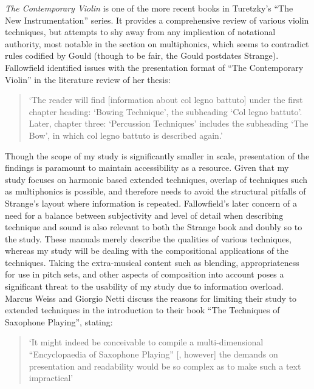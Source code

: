 \textit{The Contemporary Violin} is one of the more recent books in Turetzky’s “The New Instrumentation” series. It provides a comprehensive review of various violin techniques, but attempts to shy away from any implication of notational authority, most notable in the section on multiphonics, which seems to contradict rules codified by Gould (though to be fair, the Gould postdates Strange).\autocites[134]{strangeContemporaryViolinExtended2001}[257-258]{gouldBars2011} Fallowfield identified issues with the presentation format of “The Contemporary Violin” in the literature review of her thesis: 
\begin{quotation}
    ‘The reader will find [information about col legno battuto] under the first chapter heading: ‘Bowing Technique’, the subheading ‘Col legno battuto’. Later, chapter three: ‘Percussion Techniques’ includes the subheading ‘The Bow’, in which col legno battuto is described again.’\autocite[12]{fallowfieldCelloMapHandbook2009}
\end{quotation}
Though the scope of my study is significantly smaller in scale, presentation of the findings is paramount to maintain accessibility as a resource. Given that my study focuses on harmonic based extended techniques, overlap of techniques such as multiphonics is possible, and therefore needs to avoid the structural pitfalls of Strange’s layout where information is repeated. Fallowfield’s later concern of a need for a balance between subjectivity and level of detail when describing technique and sound is also relevant to both the Strange book and doubly so to the study. These manuals merely describe the qualities of various techniques, whereas my study will be dealing with the compositional applications of the techniques. Taking the extra-musical content such as blending, appropriateness for use in pitch sets, and other aspects of composition into account poses a significant threat to the usability of my study due to information overload. Marcus Weiss and Giorgio Netti discuss the reasons for limiting their study to extended techniques in the introduction to their book “The Techniques of Saxophone Playing”, stating:
\begin{quotation}
    ‘It might indeed be conceivable to compile a multi-dimensional “Encyclopaedia of Saxophone Playing” [, however] the demands on presentation and readability would be so complex as to make such a text impractical’\autocite[Introduction]{weissTechniquesSaxophonePlaying2010}
\end{quotation}

